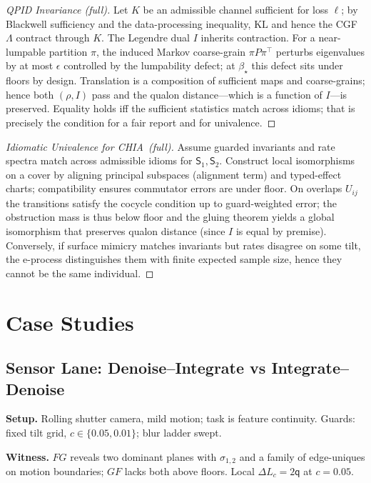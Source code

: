 \documentclass[11pt]{article}
\newcommand{\1}{\mathbf{1}}
\newcommand{\KL}{\mathrm{KL}}
\newcommand{\ratio}{\rho}
\newcommand{\rate}{I}
\newcommand{\Blur}{\beta}
\newcommand{\Lc}{L_c}
\newcommand{\Fop}{F}
\newcommand{\Gop}{G}
\newcommand{\FG}{\Fop\Gop}
\newcommand{\GF}{\Gop\Fop}
\newcommand{\Qualon}{\mathsf{q}}        %
\newcommand{\CHIA}{\textsc{CHIA}}
\newcommand{\Cluster}{\mathsf{S}}
\begin{document}
\begin{proof}[QPID Invariance (full)]
Let $K$ be an admissible channel sufficient for loss $\ell$; by Blackwell sufficiency and the data-processing inequality, $\KL$ and hence the CGF $\Lambda$ contract through $K$. The Legendre dual $\rate$ inherits contraction. For a near-lumpable partition $\pi$, the induced Markov coarse-grain $\pi P\pi^\top$ perturbs eigenvalues by at most $\epsilon$ controlled by the lumpability defect; at $\Blur_\star$ this defect sits under floors by design. Translation is a composition of sufficient maps and coarse-grains; hence both $(\ratio,\rate)$ pass and the qualon distance—which is a function of $\rate$—is preserved. Equality holds iff the sufficient statistics match across idioms; that is precisely the condition for a fair report and for univalence.
\end{proof}

\begin{proof}[Idiomatic Univalence for \CHIA\ (full)]
Assume guarded invariants and rate spectra match across admissible idioms for $\Cluster_1,\Cluster_2$. Construct local isomorphisms on a cover by aligning principal subspaces (alignment term) and typed-effect charts; compatibility ensures commutator errors are under floor. On overlaps $U_{ij}$ the transitions satisfy the cocycle condition up to guard-weighted error; the obstruction mass is thus below floor and the gluing theorem yields a global isomorphism that preserves qualon distance (since $\rate$ is equal by premise). Conversely, if surface mimicry matches invariants but rates disagree on some tilt, the e-process distinguishes them with finite expected sample size, hence they cannot be the same individual.
\end{proof}

\section{Case Studies}

\subsection{Sensor Lane: Denoise–Integrate vs Integrate–Denoise}
\textbf{Setup.} Rolling shutter camera, mild motion; task is feature continuity. Guards: fixed tilt grid, $c\!\in\!\{0.05,0.01\}$; blur ladder swept.

\textbf{Witness.} $\FG$ reveals two dominant planes with $\sigma_{1,2}$ and a family of edge-uniques on motion boundaries; $\GF$ lacks both above floors. Local $\Delta\Lc=2\Qualon$ at $c=0.05$.
\end{document}
